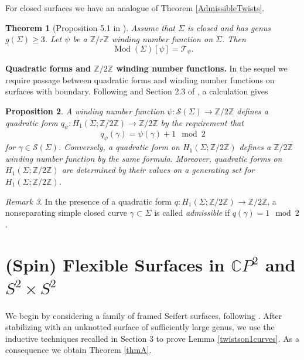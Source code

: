 \documentclass[10pt]{amsart}
\numberwithin{equation}{section}
\theoremstyle{plain}
\newtheorem{theorem}{Theorem}[section]
\newtheorem{proposition}[theorem]{Proposition}
\theoremstyle{definition}
\theoremstyle{remark}
\newtheorem{rmk}[theorem]{Remark}
\DeclareMathOperator{\Mod}{Mod}
\begin{document}
For closed surfaces we have an analogue of Theorem \ref{AdmissibleTwists}.  


\begin{theorem}[Proposition 5.1 in \cite{CalderonSalter}]
Assume that $\Sigma$ is closed and has genus $g(\Sigma) \geq 3$. Let $\psi$ be a $\mathbb{Z}/r\mathbb{Z}$ winding number function on $\Sigma$. Then \[\Mod(\Sigma)[\psi] = \mathcal{T}_{\psi}.\]
\label{admissiblespin}
\end{theorem}

\textbf{Quadratic forms and $\mathbb{Z}/2\mathbb{Z}$ winding number functions.} 
In the sequel we require passage between quadratic forms and winding number functions on surfaces with boundary. Following \cite{Johnsonspin} and Section 2.3 of \cite{Randal-Williams}, a calculation gives
\begin{proposition} \label{QuadraticFormSpin}
A winding number function $\psi : \mathcal{S}(\Sigma) \to \mathbb{Z}/2\mathbb{Z}$ defines a quadratic form $q_{\psi} : H_1(\Sigma;\mathbb{Z}/2\mathbb{Z}) \to \mathbb{Z}/2\mathbb{Z}$ by the requirement that 
\[q_{\psi}(\gamma) = \psi(\gamma) + 1\mod 2\]
for $\gamma \in \mathcal{S}(\Sigma)$. Conversely, a quadratic form on $H_1(\Sigma;\mathbb{Z}/2\mathbb{Z})$ defines a $\mathbb{Z}/2\mathbb{Z}$ winding number function by the same formula. Moreover, quadratic forms on $H_1(\Sigma;\mathbb{Z}/2\mathbb{Z})$ are determined by their values on a generating set for $H_1(\Sigma;\mathbb{Z}/2\mathbb{Z})$.  
\end{proposition}

\begin{rmk} \label{admissibleunderform}
In the presence of a quadratic form $q : H_1(\Sigma;\mathbb{Z}/2\mathbb{Z}) \to \mathbb{Z}/2\mathbb{Z}$, a nonseparating simple closed curve $\gamma \subset \Sigma$ is called \textit{admissible} if $q(\gamma) = 1 \mod 2$. 
\end{rmk}


\section{(Spin) Flexible Surfaces in $\mathbb{C}P^2$ and $S^2 \times S^2$}

We begin by considering a family of framed Seifert surfaces, following \cite{Ferretti}. After stabilizing with an unknotted surface of sufficiently large genus, we use the inductive techniques recalled in Section 3 to prove Lemma \ref{twistson1curves}. As a consequence we obtain Theorem \ref{thmA}. \newline
\end{document}
